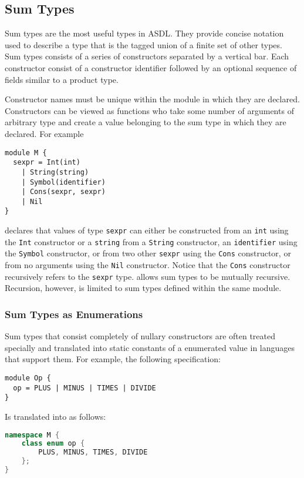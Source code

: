 \subsection{Sum Types}

Sum types are the most useful types in ASDL. They provide concise notation
used to describe a type that is the tagged union of a finite set of other
types.  Sum types consists of a series of constructors separated by a
vertical bar. Each constructor consist of a constructor identifier followed
by an optional sequence of fields similar to a product type. 

Constructor names must be unique within the module in which they are
declared. Constructors can be viewed as functions who take some number of
arguments of arbitrary type and create a value belonging to the sum type in
which they are declared. For example
\begin{code}\begin{lstlisting}[language=ASDL]
module M {
  sexpr = Int(int)
	| String(string)
	| Symbol(identifier)
	| Cons(sexpr, sexpr)
	| Nil
}
\end{lstlisting}\end{code}%
declares that values of type \lstinline[language=ASDL]!sexpr! can either be constructed from an
\lstinline[language=ASDL]!int! using the \lstinline[language=ASDL]!Int! constructor or a \lstinline[language=ASDL]!string! from a \lstinline[language=ASDL]!String!
constructor, an \lstinline[language=ASDL]!identifier! using the \lstinline[language=ASDL]!Symbol! constructor, or from
two other \lstinline[language=ASDL]!sexpr! using the \lstinline[language=ASDL]!Cons! constructor, or from no arguments
using the \lstinline[language=ASDL]!Nil! constructor.
Notice that the \lstinline[language=ASDL]!Cons! constructor
recursively refers to the \lstinline[language=ASDL]!sexpr! type.
\asdl{} allows sum types to be mutually recursive.
Recursion, however, is limited to sum types defined within the same module.

\subsubsection{Sum Types as Enumerations}
\label{sec:enumerations}

Sum types that consist completely of nullary constructors
are often treated specially and translated into static constants of a
enumerated value in languages that support them.
For example, the following \asdl{} specification:
%
\begin{code}\begin{lstlisting}[language=ASDL]
module Op {
  op = PLUS | MINUS | TIMES | DIVIDE 
}
\end{lstlisting}\end{code}%
%
Is translated into \Cplusplus{} as follows:
%
\begin{code}\begin{lstlisting}[language=c++]
namespace M {
    class enum op {
        PLUS, MINUS, TIMES, DIVIDE
    };
}
\end{lstlisting}\end{code}%

